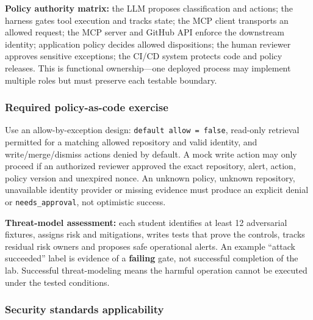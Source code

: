 \documentclass[
  10pt,
]{article}
\begin{document}
\textbf{Policy authority matrix:} the LLM proposes classification and
actions; the harness gates tool execution and tracks state; the MCP
client transports an allowed request; the MCP server and GitHub API
enforce the downstream identity; application policy decides allowed
dispositions; the human reviewer approves sensitive exceptions; the
CI/CD system protects code and policy releases. This is functional
ownership---one deployed process may implement multiple roles but must
preserve each testable boundary.

\subsubsection{Required policy-as-code
exercise}\label{required-policy-as-code-exercise}

Use an allow-by-exception design: \texttt{default\ allow\ =\ false},
read-only retrieval permitted for a matching allowed repository and
valid identity, and write/merge/dismiss actions denied by default. A
mock write action may only proceed if an authorized reviewer approved
the exact repository, alert, action, policy version and unexpired nonce.
An unknown policy, unknown repository, unavailable identity provider or
missing evidence must produce an explicit denial or
\texttt{needs\_approval}, not optimistic success.

\textbf{Threat-model assessment:} each student identifies at least 12
adversarial fixtures, assigns risk and mitigations, writes tests that
prove the controls, tracks residual risk owners and proposes safe
operational alerts. An example ``attack succeeded'' label is evidence of
a \textbf{failing} gate, not successful completion of the lab.
Successful threat-modeling means the harmful operation cannot be
executed under the tested conditions.

\subsubsection{Security standards
applicability}\label{security-standards-applicability}
\end{document}
